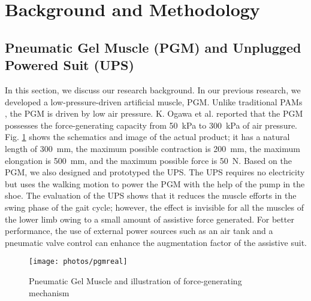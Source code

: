 \documentclass[paper,JRM,paper]{jaciiiarticle}
\begin{document}
\section{Background and Methodology}

\subsection{Pneumatic Gel Muscle (PGM) and Unplugged Powered Suit (UPS)}
In this section, we discuss our research background. In our previous research\cite{13}, we developed a low-pressure-driven artificial muscle, PGM. Unlike traditional PAMs \cite{14}, the PGM is driven by low air pressure. K. Ogawa et al. reported that the PGM possesses the force-generating capacity from \SI{50}{\kilo\pascal} to \SI{300}{\kilo\pascal} of air pressure. Fig. \ref{fig:pgmreal} shows the schematics and image of the actual product; it has a natural length of \SI{300}{\milli\meter}, the maximum possible contraction is \SI{200}{\milli\meter}, the maximum elongation is \SI{500}{\milli\meter}, and the maximum possible force is \SI{50}{\newton}. Based on the PGM, we also designed and prototyped the UPS. The UPS requires no electricity but uses the walking motion to power the PGM with the help of the pump in the shoe. The evaluation of the UPS shows that it reduces the muscle efforts in the swing phase of the gait cycle; however, the effect is invisible for all the muscles of the lower limb owing to a small amount of assistive force generated. For better performance, the use of external power sources such as an air tank and a pneumatic valve control can enhance the augmentation factor of the assistive suit. 

\begin{figure}
	\centering
	\texttt{[image: photos/pgmreal]}
	\caption{Pneumatic Gel Muscle and illustration of force-generating mechanism}
	\label{fig:pgmreal}
\end{figure}
\end{document}
